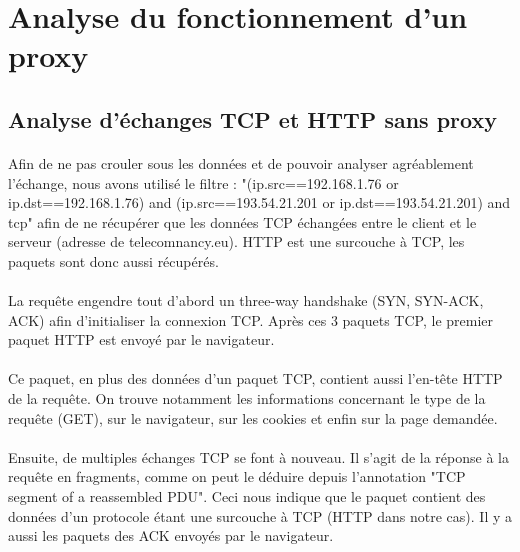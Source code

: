 \section{Analyse du fonctionnement d'un proxy}

\subsection{Analyse d'échanges TCP et HTTP sans proxy}

\paragraph{}

Afin de ne pas crouler sous les données et de pouvoir analyser agréablement l'échange, nous avons utilisé le filtre :
"(ip.src==192.168.1.76 or ip.dst==192.168.1.76) and (ip.src==193.54.21.201 or ip.dst==193.54.21.201) and tcp"
afin de ne récupérer que les données TCP échangées entre le client et le serveur (adresse de telecomnancy.eu). HTTP est une surcouche à TCP, les paquets sont donc aussi récupérés.
\paragraph{}
La requête engendre tout d'abord un three-way handshake (SYN, SYN-ACK, ACK) afin d'initialiser la connexion TCP.
Après ces 3 paquets TCP, le premier paquet HTTP est envoyé par le navigateur.
\paragraph{}
Ce paquet, en plus des données d'un paquet TCP, contient aussi l'en-tête HTTP de la requête. On trouve notamment les informations concernant le type de la requête (GET), sur le navigateur, sur les cookies et enfin sur la page demandée. \paragraph{}

Ensuite, de multiples échanges TCP se font à nouveau. Il s'agit de la réponse à la requête en fragments, comme on peut le déduire depuis l'annotation "TCP segment of a reassembled PDU". Ceci nous indique que le paquet contient des données d'un protocole étant une surcouche à TCP (HTTP dans notre cas). Il y a aussi les paquets des ACK envoyés par le navigateur. \paragraph{}

